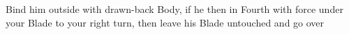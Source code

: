 \exercise{}

Bind him outside with drawn-back Body, if he then in Fourth with force under your Blade to your right turn, then leave his Blade untouched and go over
